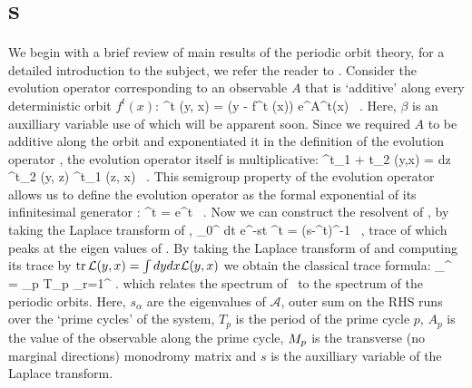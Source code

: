 \section{\CycForm s}
\label{s:DynAvers}
We begin with a brief review of main results of the periodic 
orbit theory, for a detailed introduction to the subject, we refer the reader to 
. Consider the evolution operator corresponding to an observable 
$A$ that is `additive' along every deterministic orbit $f^t(x)$:
\beq
	\Lop^t (y, x) = \delta (y - f^t (x)) e^{\beta A^t(x)} \, .
	\label{eq-EvOp}
\eeq
Here, $\beta$ is an auxilliary variable use of which will be apparent soon.
Since we required $A$ to be additive along the orbit and exponentiated
it in the definition of the evolution operator , the
evolution operator itself is multiplicative:
\beq
	\Lop^{t_1 + t_2} (y,x) = \int dz \Lop^{t_2} (y, z) \Lop^{t_1} (z, x) \, . 
	\label{eq-SemiGroup}
\eeq
This semigroup property of the evolution operator allows us to define
the evolution operator as the formal exponential of its infinitesimal
generator \Aop :
\beq
	\Lop^t = e^{\Aop t} \, . 
	\label{eq-EvOpExp}
\eeq 
Now we can construct the resolvent of \Aop , by taking the Laplace
transform of , 
\beq
	\int_0^{\infty} dt e^{-st} \Lop^t = (s-\Aop^t)^{-1} \, ,
	\label{eq-ResoolventA}
\eeq
trace of which peaks at the eigen values of \Aop. By taking the
Laplace transform of  and computing its trace 
by $\mbox{\rm tr}\, {\cal L} (y,x) = \int dy dx {\cal L} (y,x)$ we obtain the
classical trace formula:
\beq
\sum_{}^{\infty}  = \sum_p T_p \sum_{r=1}^{\infty}  .
which relates the spectrum of \Aop\ to the spectrum of the periodic 
orbits. Here, $s_{\alpha}$ are the eigenvalues of $\mathcal{A}$, 
outer sum on the RHS runs over the `prime cycles' of the system, 
$T_p$ is the period of the prime cycle $p$, $A_p$ is the value of 
the observable along the prime cycle, $M_p$ is the transverse 
(no marginal directions) monodromy matrix and $s$ is the auxilliary
variable of the Laplace transform.


